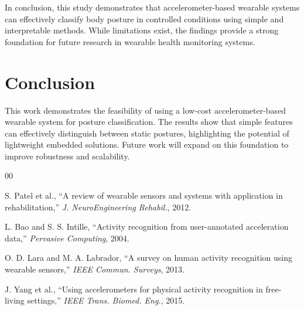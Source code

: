 \documentclass[journal]{IEEEtran}
\begin{document}
In conclusion, this study demonstrates that accelerometer-based wearable systems can effectively classify body posture in controlled conditions using simple and interpretable methods. While limitations exist, the findings provide a strong foundation for future research in wearable health monitoring systems.

\section{Conclusion}

This work demonstrates the feasibility of using a low-cost accelerometer-based wearable system for posture classification. The results show that simple features can effectively distinguish between static postures, highlighting the potential of lightweight embedded solutions. Future work will expand on this foundation to improve robustness and scalability.

\begin{thebibliography}{00}

 S. Patel et al., “A review of wearable sensors and systems with application in rehabilitation,” \textit{J. NeuroEngineering Rehabil.}, 2012.

 L. Bao and S. S. Intille, “Activity recognition from user-annotated acceleration data,” \textit{Pervasive Computing}, 2004.

 O. D. Lara and M. A. Labrador, “A survey on human activity recognition using wearable sensors,” \textit{IEEE Commun. Surveys}, 2013.

 J. Yang et al., “Using accelerometers for physical activity recognition in free-living settings,” \textit{IEEE Trans. Biomed. Eng.}, 2015.

\end{thebibliography}
\end{document}
